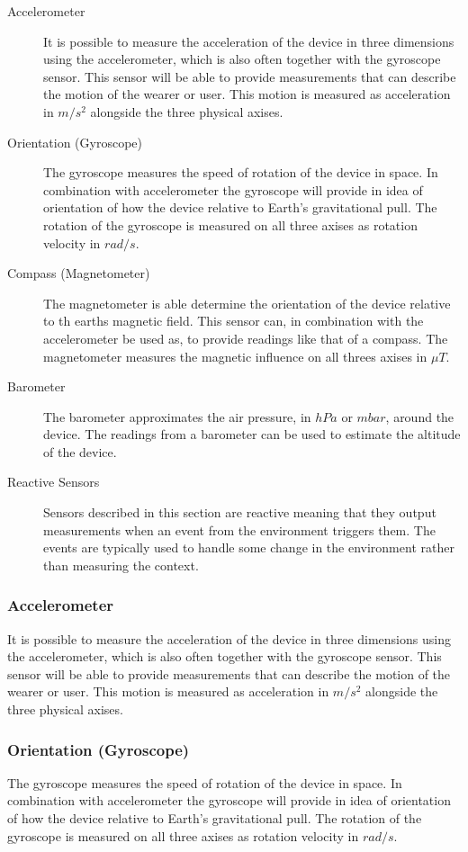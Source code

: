 \begin{description}
	\item[Accelerometer] It is possible to measure the acceleration of the device in three dimensions using the accelerometer, which is also often together with the gyroscope sensor. This sensor will be able to provide measurements that can describe the motion of the wearer or user. This motion is measured as acceleration in $m/s^2$ alongside the three physical axises.
	\item[Orientation (Gyroscope)] The gyroscope measures the speed of rotation of the device in space. In combination with accelerometer the gyroscope will provide in idea of orientation of how the device relative to Earth's gravitational pull. The rotation of the gyroscope is measured on all three axises as rotation velocity in $rad/s$.
	\item[Compass (Magnetometer)] The magnetometer is able determine the orientation of the device relative to th earths magnetic field. This sensor can, in combination with the accelerometer be used as, to provide readings like that of a compass. The magnetometer measures the magnetic influence on all threes axises in $\mu T$.
	\item[Barometer] The barometer approximates the air pressure, in $hPa$ or $mbar$, around the device. The readings from a barometer can be used to estimate the altitude of the device.
	\item[Reactive Sensors] Sensors described in this section are reactive meaning that they output measurements when an event from the environment triggers them. The events are typically used to handle some change in the environment rather than measuring the context.
\end{description}

\subsubsection{Accelerometer}
It is possible to measure the acceleration of the device in three dimensions using the accelerometer, which is also often together with the gyroscope sensor. This sensor will be able to provide measurements that can describe the motion of the wearer or user. This motion is measured as acceleration in $m/s^2$ alongside the three physical axises.

\subsubsection{Orientation (Gyroscope)}
The gyroscope measures the speed of rotation of the device in space. In combination with accelerometer the gyroscope will provide in idea of orientation of how the device relative to Earth's gravitational pull. The rotation of the gyroscope is measured on all three axises as rotation velocity in $rad/s$.

